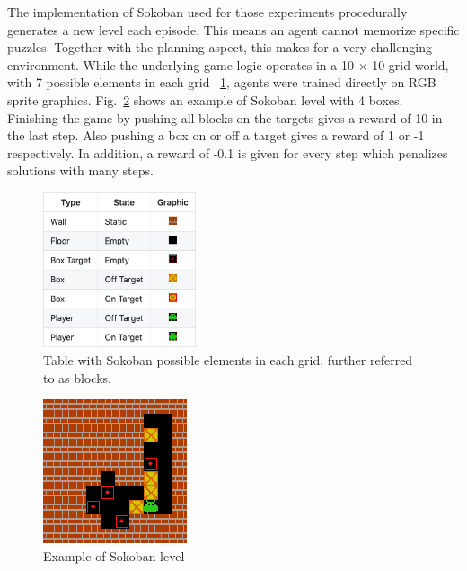 The implementation of Sokoban used for those experiments procedurally generates a new level each episode. This means an agent cannot memorize specific puzzles. Together with the planning aspect, this makes for a very challenging environment. While the underlying game logic operates in a 10 × 10 grid world, with 7 possible elements in each grid ~\ref{Fig.Sokoban_elements}, agents were trained directly on RGB sprite graphics. Fig.~\ref{Fig.Sokoban} shows an example of Sokoban level with 4 boxes. \\
Finishing the game by pushing all blocks on the targets gives a reward of 10 in the last step. Also pushing a box on or off a target gives a reward of 1 or -1 respectively. In addition, a reward of -0.1 is given for every step which penalizes solutions with many steps.

\begin{figure}[H]
\includegraphics[width=0.4\textwidth,keepaspectratio]{figures/Sokoban_elements.png}
\caption[Sokoban elements]{Table with Sokoban possible elements in each grid, further referred to as blocks.}
\label{Fig.Sokoban_elements}
\end{figure}

\begin{figure}[H]
\includegraphics[]{figures/Sokoban.png}
\caption[Sokoban]{Example of Sokoban level}
\label{Fig.Sokoban}
\end{figure}
